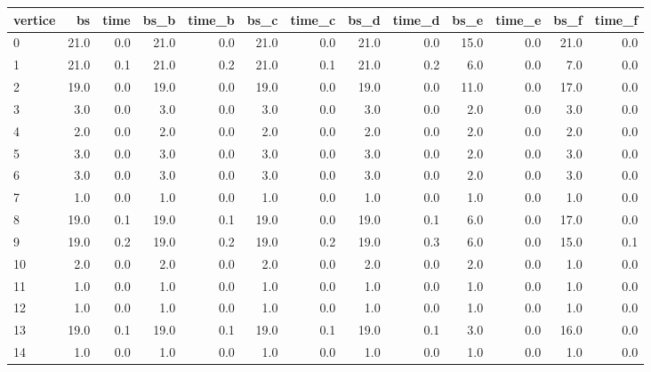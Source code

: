\begin{tabular}{lrrrrrrrrrrrr}
\toprule
vertice &    bs &  time &  bs\_b &  time\_b &  bs\_c &  time\_c &  bs\_d &  time\_d &  bs\_e &  time\_e &  bs\_f &  time\_f \\
\midrule
      0 &  21.0 &   0.0 &  21.0 &     0.0 &  21.0 &     0.0 &  21.0 &     0.0 &  15.0 &     0.0 &  21.0 &     0.0 \\
      1 &  21.0 &   0.1 &  21.0 &     0.2 &  21.0 &     0.1 &  21.0 &     0.2 &   6.0 &     0.0 &   7.0 &     0.0 \\
      2 &  19.0 &   0.0 &  19.0 &     0.0 &  19.0 &     0.0 &  19.0 &     0.0 &  11.0 &     0.0 &  17.0 &     0.0 \\
      3 &   3.0 &   0.0 &   3.0 &     0.0 &   3.0 &     0.0 &   3.0 &     0.0 &   2.0 &     0.0 &   3.0 &     0.0 \\
      4 &   2.0 &   0.0 &   2.0 &     0.0 &   2.0 &     0.0 &   2.0 &     0.0 &   2.0 &     0.0 &   2.0 &     0.0 \\
      5 &   3.0 &   0.0 &   3.0 &     0.0 &   3.0 &     0.0 &   3.0 &     0.0 &   2.0 &     0.0 &   3.0 &     0.0 \\
      6 &   3.0 &   0.0 &   3.0 &     0.0 &   3.0 &     0.0 &   3.0 &     0.0 &   2.0 &     0.0 &   3.0 &     0.0 \\
      7 &   1.0 &   0.0 &   1.0 &     0.0 &   1.0 &     0.0 &   1.0 &     0.0 &   1.0 &     0.0 &   1.0 &     0.0 \\
      8 &  19.0 &   0.1 &  19.0 &     0.1 &  19.0 &     0.0 &  19.0 &     0.1 &   6.0 &     0.0 &  17.0 &     0.0 \\
      9 &  19.0 &   0.2 &  19.0 &     0.2 &  19.0 &     0.2 &  19.0 &     0.3 &   6.0 &     0.0 &  15.0 &     0.1 \\
     10 &   2.0 &   0.0 &   2.0 &     0.0 &   2.0 &     0.0 &   2.0 &     0.0 &   2.0 &     0.0 &   1.0 &     0.0 \\
     11 &   1.0 &   0.0 &   1.0 &     0.0 &   1.0 &     0.0 &   1.0 &     0.0 &   1.0 &     0.0 &   1.0 &     0.0 \\
     12 &   1.0 &   0.0 &   1.0 &     0.0 &   1.0 &     0.0 &   1.0 &     0.0 &   1.0 &     0.0 &   1.0 &     0.0 \\
     13 &  19.0 &   0.1 &  19.0 &     0.1 &  19.0 &     0.1 &  19.0 &     0.1 &   3.0 &     0.0 &  16.0 &     0.0 \\
     14 &   1.0 &   0.0 &   1.0 &     0.0 &   1.0 &     0.0 &   1.0 &     0.0 &   1.0 &     0.0 &   1.0 &     0.0 \\

\end{tabular}
